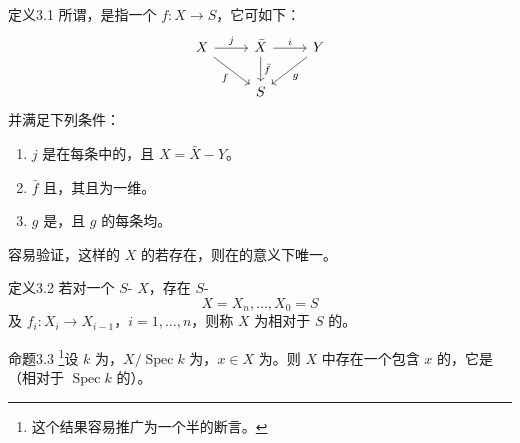 \begin{SGAresult}{定义}{3.1}
所谓，是指一个 $f:X\to S$，它可如下：
\[
\begin{tikzcd}
X\arrow[r,"j"]\arrow[dr,"f"']&\bar X\arrow[r,"i"]\arrow[d,"\bar f"]&Y\arrow[dl,"g"]\\
&S&
\end{tikzcd}
\]
并满足下列条件：
\begin{enumerate}
\item[(i)] $j$ 是在每条中的，且 $X=\bar X-Y$。
\item[(ii)] $\bar f$ 且，其且为一维。
\item[(iii)] $g$ 是，且 $g$ 的每条均。
\end{enumerate}
\end{SGAresult}
容易验证，这样的 $X$ 的若存在，则在的意义下唯一。
\begin{SGAresult}{定义}{3.2}
若对一个 $S$- $X$，存在 $S$-
\[
 X=X_n,\ldots,X_0=S
\]
及 $f_i:X_i\to X_{i-1}$，$i=1,\ldots,n$，则称 $X$ 为相对于 $S$ 的。
\end{SGAresult}
\begin{SGAresult}{命题}{3.3}
\footnote{这个结果容易推广为一个半的断言。}设 $k$ 为，$X/\operatorname{Spec}k$ 为，$x\in X$ 为。则 $X$ 中存在一个包含 $x$ 的，它是（相对于 $\operatorname{Spec}k$ 的）。
\end{SGAresult}
